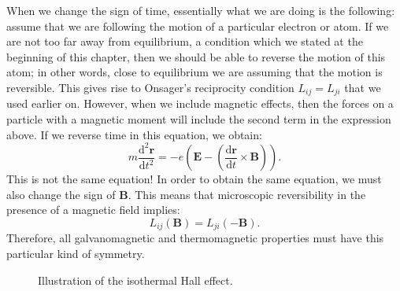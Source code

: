 When we change the sign of time, essentially what we are doing is the following:  assume that we are following the motion of a particular electron or atom.  If we are not too far away from equilibrium, a condition which we stated at the beginning of this chapter, then we should be able to reverse the motion of this atom; in other words, close to equilibrium we are assuming that the motion is reversible.  This gives rise to Onsager's reciprocity condition $L_{ij}=L_{ji}$ that we used earlier on.  However, when we include magnetic effects, then the forces on a particle with a magnetic moment will include the second term in the expression above.  If we reverse time in this equation, we obtain:
\[
	m\frac{\mathrm{d}^2 \mathbf{r}}{\mathrm{d}t^2} = -e(\mathbf{E}-(\frac{\mathrm{d}\mathbf{r}}{\mathrm{d}t}
	\times\mathbf{B})).
\]
This is not the same equation!  In order to obtain the same equation, we must also change the sign of $\mathbf{B}$. This means that microscopic reversibility in the presence of a magnetic field implies:
\[
	L_{ij}(\mathbf{B}) = L_{ji}(-\mathbf{B}).
\]
Therefore, all galvanomagnetic and thermomagnetic properties must have this particular kind of symmetry.

\begin{figure}[t]
\caption{Illustration of the isothermal Hall effect.}
\label{\chabbr:fig:Hall}
\end{figure}

